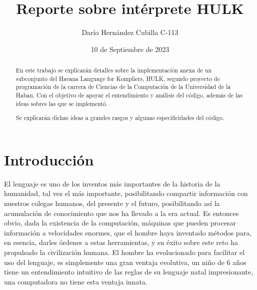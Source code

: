 \documentclass{article}
\begin{document}
\title{Reporte sobre intérprete HULK}
\author{Darío Hernández Cubilla C-113}
\date{10 de Septiembre de 2023}
\maketitle

\tableofcontents

\begin{abstract}
    En este trabajo se explicarán detalles sobre la implementación anexa de un subconjunto
    del Havana Language for Kompliers, HULK, segundo proyecto de programación de la carrera
    de Ciencias de la Computación de la Universidad de la Haban. Con el objetivo de apoyar 
    el entendimiento y análisis del código, además de las ideas sobres las que se implementó.

    Se explicarán dichas ideas a grandes rasgos y algunas especificidades del código.
\end{abstract}

\newpage

\section*{Introducción}
El lenguaje es uno de los inventos más importantes de la historia de la humanidad, tal vez el más importante, posibilitando compartir información con nuestros colegas humanos, del presente y el futuro, posibilitando así la acumulación de conocimiento que nos ha llevado a la era actual. Es entonces obvio, dada la existencia de la computación, máquinas que pueden procesar información a velocidades enormes, que el hombre haya inventado métodos para, en esencia, darles órdenes a estas herramientas, y su éxito sobre este reto ha propulsado la civilización humana. El hombre ha evolucionado para facilitar el uso del lenguaje, es simplemente una gran ventaja evolutiva, un niño de 6 años tiene un entendimiento intuitivo de las reglas de su lenguaje natal impresionante, una computadora no tiene esta ventaja innata.
\end{document}
